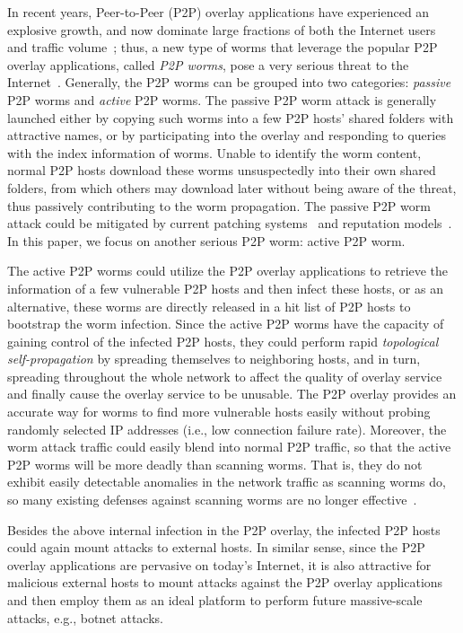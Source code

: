 \documentclass[times,10pt,twocolumn]{article}
\begin{document}
In recent years, Peer-to-Peer (P2P) overlay applications have
experienced an explosive growth, and now dominate large fractions of
both the Internet users and traffic volume~\cite{KumarYBRR06}; thus,
a new type of worms that leverage the popular P2P overlay
applications, called \emph{P2P worms}, pose a very serious threat to
the Internet~\cite{p2p-worm-website}. Generally, the P2P worms can
be grouped into two categories: \emph{passive} P2P worms and
\emph{active} P2P worms. The passive P2P worm attack is generally
launched either by copying such worms into a few P2P hosts' shared
folders with attractive names, or by participating into the overlay
and responding to queries with the index information of worms.
Unable to identify the worm content, normal P2P hosts download these
worms unsuspectedly into their own shared folders, from which others
may download later without being aware of the threat, thus passively
contributing to the worm propagation. The passive P2P worm attack
could be mitigated by current patching systems~\cite{XieSZ08} and
reputation models~\cite{WalshS06}. In this paper, we focus on
another serious P2P worm: active P2P worm.


The active P2P worms could utilize the P2P overlay applications to
retrieve the information of a few vulnerable P2P hosts and then
infect these hosts, or as an alternative, these worms are directly
released in a hit list of P2P hosts to bootstrap the worm infection.
Since the active P2P worms have the capacity of gaining control of
the infected P2P hosts, they could perform rapid \emph{topological
self-propagation} by spreading themselves to neighboring hosts, and
in turn, spreading throughout the whole network to affect the
quality of overlay service and finally cause the overlay service to
be unusable. The P2P overlay provides an accurate way for worms to
find more vulnerable hosts easily without probing randomly selected
IP addresses (i.e., low connection failure rate). Moreover, the worm
attack traffic could easily blend into normal P2P traffic, so that
the active P2P worms will be more deadly than scanning worms. That
is, they do not exhibit easily detectable anomalies in the network
traffic as scanning worms do, so many existing defenses against
scanning worms are no longer
effective~\cite{DBLP:conf/iptps/ZhouZMICC05}.

Besides the above internal infection in the P2P overlay, the
infected P2P hosts could again mount attacks to external hosts. In
similar sense, since the P2P overlay applications are pervasive on
today's Internet, it is also attractive for malicious external hosts
to mount attacks against the P2P overlay applications and then
employ them as an ideal platform to perform future massive-scale
attacks, e.g., botnet attacks.
\end{document}
